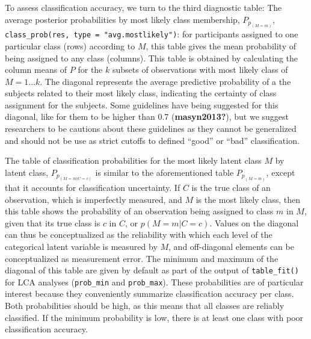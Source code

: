 \documentclass[
  ,man,floatsintext]{apa6}
\begin{document}
To assess classification accuracy, we turn to the third diagnostic
table: The average posterior probabilities by most likely class
membership, \(P_{p_{(M = m)}}\),
\texttt{class\_prob(res,\ type\ =\ "avg.mostlikely")}: for participants assigned to
one particular class (rows) according to \(M\), this table gives the mean
probability of being assigned to any class (columns). This table is
obtained by calculating the column means of \(P\) for the \(k\) subsets of
observations with most likely class of \(M = 1 \ldots k\). The diagonal
represents the average predictive probability of a the subjects related
to their most likely class, indicating the certainty of class assignment
for the subjects. Some guidelines have being suggested for this
diagonal, like for them to be higher than 0.7 (\textbf{masyn2013?}), but we
suggest researchers to be cautions about these guidelines as they cannot
be generalized and should not be use as strict cutoffs to defined ``good''
or ``bad'' classification.

The table of classification probabilities for the most likely latent
class \(M\) by latent class, \(P_{p_{(M = m | C = c)}}\) is similar to the
aforementioned table \(P_{p_{(M = m)}}\), except that it accounts for
classification uncertainty. If \(C\) is the true class of an observation,
which is imperfectly measured, and \(M\) is the most likely class, then
this table shows the probability of an observation being assigned to
class \(m\) in \(M\), given that its true class is \(c\) in \(C\), or
\(p(M=m|C=c)\). Values on the diagonal can thus be conceptualized as the
reliability with which each level of the categorical latent variable is
measured by \(M\), and off-diagonal elements can be conceptualized as
measurement error. The minimum and maximum of the diagonal of this table
are given by default as part of the output of \texttt{table\_fit()} for LCA
analyses (\texttt{prob\_min} and \texttt{prob\_max}). These probabilities are of
particular interest because they conveniently summarize classification
accuracy per class. Both probabilities should be high, as this means
that all classes are reliably classified. If the minimum probability is
low, there is at least one class with poor classification accuracy.
\end{document}
